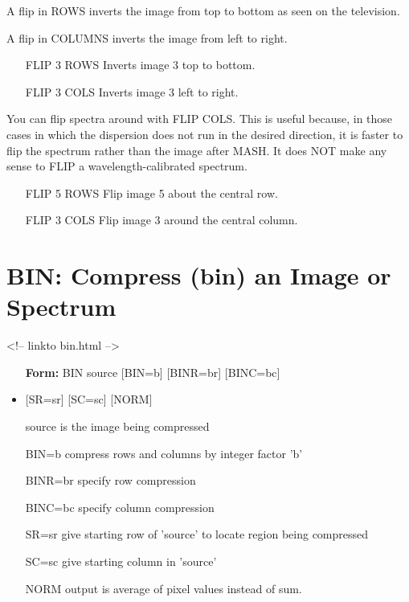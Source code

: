 A flip in ROWS inverts the image from top to bottom as seen on the
television.

A flip in COLUMNS inverts the image from left to right.  

\begin{itemize}
  \item[FLIP 3 ROWS\hfill]{Inverts image 3 top to bottom.}
  \item[FLIP 3 COLS\hfill]{Inverts image 3 left to right.}
\end{itemize}
You can flip spectra around with FLIP COLS.  This is useful because, in
those cases in which the dispersion does not run in the desired direction,
it is faster to flip the spectrum rather than the image after MASH.  It
does NOT make any sense to FLIP a wavelength-calibrated spectrum.
\begin{itemize}
  \item[FLIP 5 ROWS\hfill]{Flip image 5 about the central row.}
  \item[FLIP 3 COLS\hfill]{Flip image 3 around the central column.}
\end{itemize}

\section{BIN: Compress (bin) an Image or Spectrum}
\begin{rawhtml}
<!-- linkto bin.html -->
\end{rawhtml}

\begin{itemize}
  \item[\textbf{Form: }BIN source {[BIN=b]} {[BINR=br]} {[BINC=bc]} \hfill]{}
  \item{{[SR=sr]} {[SC=sc]} {[NORM]}}
  \item[source]{is the image being compressed}
  \item[BIN=b]{compress rows and columns by integer factor 'b'}
  \item[BINR=br]{specify row compression}
  \item[BINC=bc]{specify column compression}
  \item[SR=sr]{give starting row of 'source' to locate region
       being compressed}
  \item[SC=sc]{give starting column in 'source'}
  \item[NORM]{output is average of pixel values instead of sum.}
\end{itemize}

